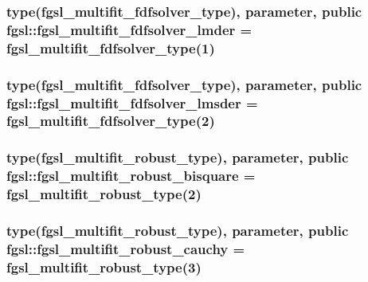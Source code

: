 \hypertarget{classfgsl_a8d1aeaeb6d1cc87ec0d79eddf44965b8}{
\subsubsection[{fgsl\-\_\-multifit\-\_\-fdfsolver\-\_\-lmder}]{\setlength{\rightskip}{0pt plus 5cm}type({\bf fgsl\-\_\-multifit\-\_\-fdfsolver\-\_\-type}), parameter, public fgsl\-::fgsl\-\_\-multifit\-\_\-fdfsolver\-\_\-lmder = {\bf fgsl\-\_\-multifit\-\_\-fdfsolver\-\_\-type}(1)}}\label{classfgsl_a8d1aeaeb6d1cc87ec0d79eddf44965b8}
\hypertarget{classfgsl_a24b9409272a5a9556e295c38502b6dbc}{
\subsubsection[{fgsl\-\_\-multifit\-\_\-fdfsolver\-\_\-lmsder}]{\setlength{\rightskip}{0pt plus 5cm}type({\bf fgsl\-\_\-multifit\-\_\-fdfsolver\-\_\-type}), parameter, public fgsl\-::fgsl\-\_\-multifit\-\_\-fdfsolver\-\_\-lmsder = {\bf fgsl\-\_\-multifit\-\_\-fdfsolver\-\_\-type}(2)}}\label{classfgsl_a24b9409272a5a9556e295c38502b6dbc}
\hypertarget{classfgsl_a36d1b09a0ed8ea4c5836ecc7e19e143a}{
\subsubsection[{fgsl\-\_\-multifit\-\_\-robust\-\_\-bisquare}]{\setlength{\rightskip}{0pt plus 5cm}type({\bf fgsl\-\_\-multifit\-\_\-robust\-\_\-type}), parameter, public fgsl\-::fgsl\-\_\-multifit\-\_\-robust\-\_\-bisquare = {\bf fgsl\-\_\-multifit\-\_\-robust\-\_\-type}(2)}}\label{classfgsl_a36d1b09a0ed8ea4c5836ecc7e19e143a}
\hypertarget{classfgsl_a106b8dc39c3609e38744526153f66d25}{
\subsubsection[{fgsl\-\_\-multifit\-\_\-robust\-\_\-cauchy}]{\setlength{\rightskip}{0pt plus 5cm}type({\bf fgsl\-\_\-multifit\-\_\-robust\-\_\-type}), parameter, public fgsl\-::fgsl\-\_\-multifit\-\_\-robust\-\_\-cauchy = {\bf fgsl\-\_\-multifit\-\_\-robust\-\_\-type}(3)}}\label{classfgsl_a106b8dc39c3609e38744526153f66d25}
